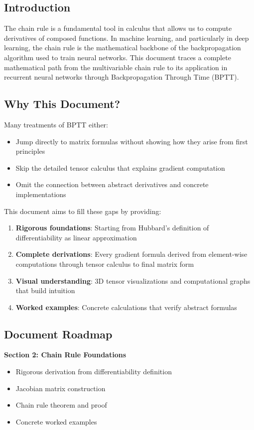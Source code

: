 \begin{notechapter}
\section{Introduction}
The chain rule is a fundamental tool in calculus that allows us to compute
derivatives of composed functions. In machine learning, and particularly in deep
learning, the chain rule is the mathematical backbone of the backpropagation
algorithm used to train neural networks. This document traces a complete
mathematical path from the multivariable chain rule to its application in
recurrent neural networks through Backpropagation Through Time (BPTT).

\subsection{Why This Document?}

Many treatments of BPTT either:
\begin{itemize}[leftmargin=*]
    \item Jump directly to matrix formulas without showing how they arise from first principles
    \item Skip the detailed tensor calculus that explains gradient computation
    \item Omit the connection between abstract derivatives and concrete implementations
\end{itemize}

This document aims to fill these gaps by providing:
\begin{enumerate}[leftmargin=*]
    \item \textbf{Rigorous foundations}: Starting from Hubbard's definition of differentiability as linear approximation
    \item \textbf{Complete derivations}: Every gradient formula derived from element-wise computations through tensor calculus to final matrix form
    \item \textbf{Visual understanding}: 3D tensor visualizations and computational graphs that build intuition
    \item \textbf{Worked examples}: Concrete calculations that verify abstract formulas
\end{enumerate}

\subsection{Document Roadmap}

\textbf{Section 2: Chain Rule Foundations}
\begin{itemize}[leftmargin=*,itemsep=0pt]
    \item Rigorous derivation from differentiability definition
    \item Jacobian matrix construction
    \item Chain rule theorem and proof
    \item Concrete worked examples
\end{itemize}


\end{notechapter}
